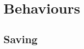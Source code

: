 \documentclass[a4paper, 11pt]{report}
\begin{document}
					\chapter{Behaviours}

\section{Saving}
\end{document}
